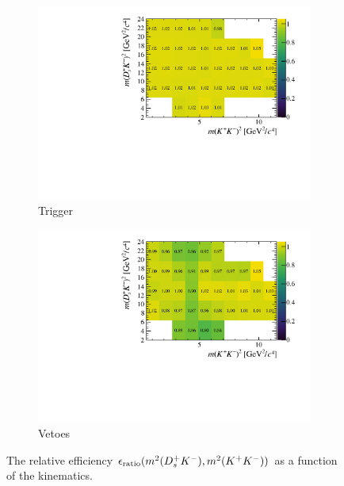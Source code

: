 \begin{figure}[!h]
   \centering
   \begin{subfigure}[t]{0.4\textwidth}
      \includegraphics[width=1.0\textwidth]{figs/B2DsKK/Relative_Eff_trig_All.pdf}
      \caption{Trigger}
      \label{fig:B2DsKK_releff_trigger}
   \end{subfigure}
   \begin{subfigure}[t]{0.4\textwidth}
      \includegraphics[width=1.0\textwidth]{figs/B2DsKK/Relative_Eff_veto_All.pdf}
      \caption{Vetoes}
      \label{fig:B2DsKK_releff_vetoes}
   \end{subfigure}
   \caption{The relative efficiency $\epsilon_{\text{ratio}}(m^{2}({{D}^+_{s}}{{K}^-}),m^{2}({{K}^+}{{K}^-}))$ as a function of the \decay{\Bp}{\Dsp\Kp\Km} kinematics.}
   \label{fig:B2DsKK_dalitz_eff_one}
\end{figure}

